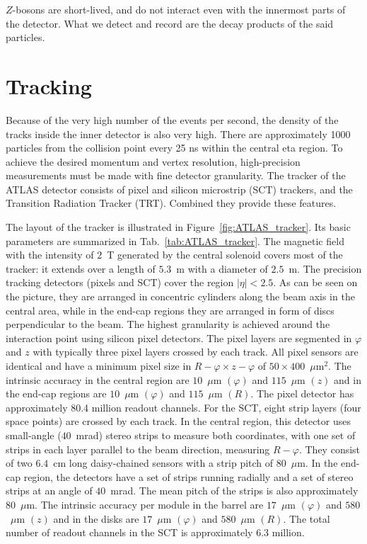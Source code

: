 $Z$-bosons are short-lived, and do not interact even with the innermost parts of the detector. What we detect and record are the decay products of the said particles.

\section{Tracking}
\label{sec:ATLAS_tracker}

Because of the very high number of the events per second, the density of the tracks inside the inner detector is also very high. There are approximately 1000 particles from the collision point every 25 ns within the central eta region. To achieve the desired momentum and vertex resolution, high-precision measurements must be made with fine detector granularity. The tracker of the ATLAS detector consists of pixel and silicon microstrip (SCT) trackers, and the Transition Radiation Tracker (TRT). Combined they provide these features.

\begin{figure}
\end{figure}

The layout of the tracker is illustrated in Figure~\ref{fig:ATLAS_tracker}. Its basic parameters are summarized in Tab.~\ref{tab:ATLAS_tracker}. The magnetic field with the intensity of $2$~T generated by the central solenoid covers most of the tracker: it extends over a length of $5.3$~m with a diameter of $2.5$~m. The precision tracking detectors (pixels and SCT) cover the region $|\eta|<2.5$. As can be seen on the picture, they are arranged in concentric cylinders along the beam axis in the central area, while in the end-cap regions they are arranged in form of discs perpendicular to the beam. The highest granularity is achieved around the interaction point using silicon pixel detectors. The pixel layers are
segmented in $\varphi$ and $z$ with typically three pixel layers crossed by each track. All pixel sensors
are identical and have a minimum pixel size in $R-\varphi \times z-\varphi$ of $50 \times 400$~$\mu$m$^2$. The intrinsic accuracy
in the central region are $10$~$\mu$m $(\varphi)$ and $115$~$\mu$m $(z)$ and in the end-cap regions are $10$~$\mu$m $(\varphi)$ and $115$~$\mu$m $(R)$.
The pixel detector has approximately 80.4 million readout channels. For the SCT, eight strip layers
(four space points) are crossed by each track. In the central region, this detector uses small-angle
($40$~mrad) stereo strips to measure both coordinates, with one set of strips in each layer parallel to
the beam direction, measuring $R-\varphi$. They consist of two $6.4$~cm long daisy-chained sensors with
a strip pitch of $80$~$\mu$m. In the end-cap region, the detectors have a set of strips running radially and
a set of stereo strips at an angle of $40$~mrad. The mean pitch of the strips is also approximately
$80$~$\mu$m. The intrinsic accuracy per module in the barrel are $17$~$\mu$m $(\varphi)$ and $580$~$\mu$m $(z)$ and in
the disks are $17$~$\mu$m $(\varphi)$ and $580$~$\mu$m $(R)$. The total number of readout channels in the SCT is
approximately 6.3 million.

